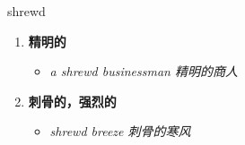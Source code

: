 
\begin{frame}
{\huge shrewd}
\begin{center}
\begin{enumerate}\Large
  \item \textbf{精明的}
  \begin{itemize}
    \item \em{\Large{a shrewd businessman 精明的商人}}
  \end{itemize}
  \item \textbf{刺骨的，强烈的}
  \begin{itemize}
    \item \em{\Large{shrewd breeze 刺骨的寒风}}
  \end{itemize}
\end{enumerate}
\end{center}
\end{frame}

